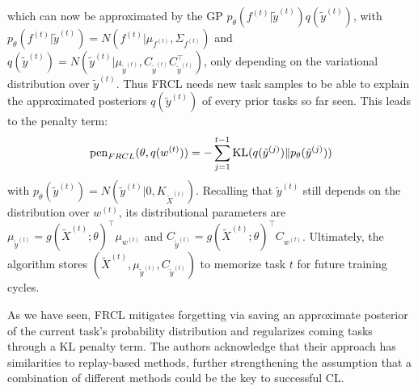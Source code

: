 which can now be approximated by the GP $p_\theta(f^{(t)}| \tilde{y}^{(t)})q(\tilde{y}^{(t)})$, with $p_\theta(f^{(t)}|\tilde{y}^{(t)}) = N(f^{(t)}|\mu_{f^{(t)}},\allowbreak \Sigma_{f^{(t)}})$ and $q(\tilde{y}^{(t)}) = N(\tilde{y}^{(t)}|\mu_{\tilde{y}^{(t)}}, C_{\tilde{y}^{(t)}}C_{\tilde{y}^{(t)}}^\top)$, only depending on the variational distribution over $\tilde{y}^{(t)}$. Thus FRCL needs new task samples to be able to explain the approximated posteriors $q(\tilde{y}^{(t)})$ of every prior tasks so far seen. This leads to the penalty term:
\begin{equation}\label{penElbo}
	\operatorname{pen}_{FRCL}(\theta, q(w^{(t)})) = - \sum_{j=1}^{t-1}\operatorname{KL}(q(\tilde{y}^{(j)})\Vert p_\theta(\tilde{y}^{(j)}))
\end{equation}
with $p_\theta(\tilde{y}^{(t)}) = N(\tilde{y}^{(t)}|0, K_{\tilde{X}^{(t)}})$. Recalling that $\tilde{y}^{(t)}$ still depends on the distribution over $w^{(t)}$, its distributional parameters are $\mu_{\tilde{y}^{(t)}} = g(\tilde{X}^{(t)}; \theta)^\top \mu_{w^{(t)}}$ and $C_{\tilde{y}^{(t)}} = g(\tilde{X}^{(t)}; \theta)^\top C_{w^{(t)}}$. Ultimately, the algorithm stores $(\tilde{X}^{(t)}, \mu_{\tilde{y}^{(t)}}, C_{\tilde{y}^{(t)}})$ to memorize task $t$ for future training cycles.

As we have seen, FRCL mitigates forgetting via saving an approximate posterior of the current task's probability distribution and regularizes coming tasks through a KL penalty term. The authors acknowledge that their approach has similarities to replay-based methods, further strengthening the assumption that a combination of different methods could be the key to successful CL.